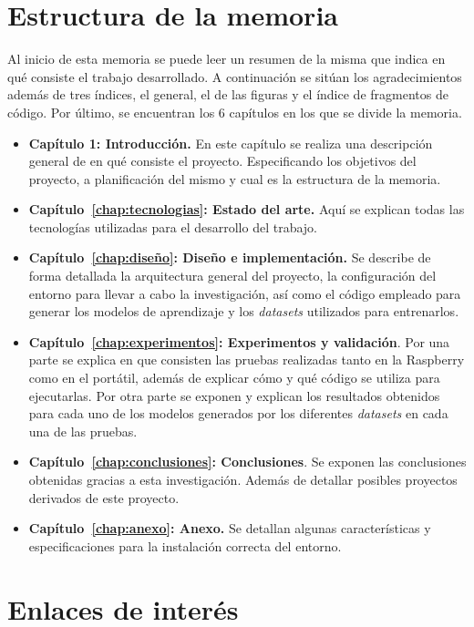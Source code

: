 \documentclass[a4paper, 12pt]{book}
\begin{document}
\section{Estructura de la memoria}
\label{sec:estructura}

Al inicio de esta memoria se puede leer un resumen de la misma que indica en qué consiste el trabajo desarrollado. A continuación se sitúan los agradecimientos además de tres índices, el general, el de las figuras y el índice de fragmentos de código. Por último, se encuentran los 6 capítulos en los que se divide la memoria.

\begin{itemize}

    \item \textbf{Capítulo 1: Introducción.} En este capítulo se realiza una descripción general de en qué consiste el proyecto. Especificando los objetivos del proyecto, a planificación del mismo y cual es la estructura de la memoria.
    \item \textbf{Capítulo~\ref{chap:tecnologias}: Estado del arte.} Aquí se explican todas las tecnologías utilizadas para el desarrollo del trabajo.
    \item \textbf{Capítulo~\ref{chap:diseño}: Diseño e implementación.} Se describe de forma detallada la arquitectura general del proyecto, la configuración del entorno para llevar a cabo la investigación, así como el código empleado para generar los modelos de aprendizaje y los \textit{datasets} utilizados para entrenarlos.
    \item \textbf{Capítulo~\ref{chap:experimentos}: Experimentos y validación}. Por una parte se explica en que consisten las pruebas realizadas tanto en la Raspberry como en el portátil, además de explicar cómo y qué código se utiliza para ejecutarlas. Por otra parte se exponen y explican los resultados obtenidos para cada uno de los modelos generados por los diferentes \textit{datasets} en cada una de las pruebas.
    \item \textbf{Capítulo~\ref{chap:conclusiones}: Conclusiones}. Se exponen las conclusiones obtenidas gracias a esta investigación. Además de detallar posibles proyectos derivados de este proyecto.
    \item \textbf{Capítulo~\ref{chap:anexo}: Anexo.} Se detallan algunas características y especificaciones para la instalación correcta del entorno.
\end{itemize}

\section{Enlaces de interés}
\label{sec:enlaces_interes}
\end{document}
